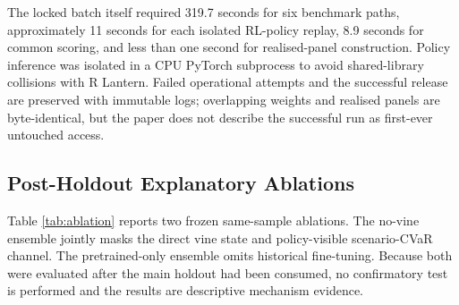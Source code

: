 The locked batch itself required 319.7 seconds for six benchmark paths, approximately 11 seconds for each isolated RL-policy replay, 8.9 seconds for common scoring, and less than one second for realised-panel construction. Policy inference was isolated in a CPU PyTorch subprocess to avoid shared-library collisions with R Lantern. Failed operational attempts and the successful release are preserved with immutable logs; overlapping weights and realised panels are byte-identical, but the paper does not describe the successful run as first-ever untouched access.

\subsection{Post-Holdout Explanatory Ablations}
\label{subsec:4_ablation}

Table \ref{tab:ablation} reports two frozen same-sample ablations. The no-vine ensemble jointly masks the direct vine state and policy-visible scenario-CVaR channel. The pretrained-only ensemble omits historical fine-tuning. Because both were evaluated after the main holdout had been consumed, no confirmatory test is performed and the results are descriptive mechanism evidence.

\begin{table}[H]
\centering
\caption{Frozen Post-Holdout Explanatory Ablations: 22 Complete Periods}
\label{tab:ablation}
\caption*{\footnotesize Notes: Post-holdout explanatory evidence on the consumed market path. Bold denotes the best observed value within this three-row comparison and is not a significance claim.}
\end{table}

